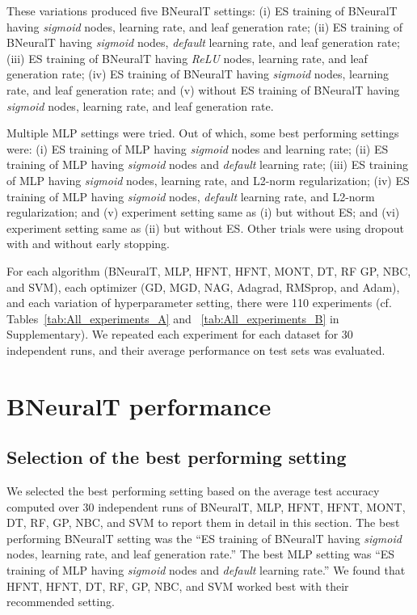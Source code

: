\documentclass[11pt,a4paper]{article}
\begin{document}
    These variations produced five BNeuralT settings: (i) ES training of BNeuralT having \textit{sigmoid} nodes,  learning rate, and  leaf generation rate; (ii) ES training of BNeuralT having \textit{sigmoid} nodes, \textit{default} learning rate, and  leaf generation rate; (iii) ES training of BNeuralT having \textit{ReLU} nodes,  learning rate, and  leaf generation rate; (iv) ES training of BNeuralT having \textit{sigmoid} nodes,  learning rate, and  leaf generation rate; and (v) without ES training of BNeuralT having \textit{sigmoid} nodes,  learning rate, and  leaf generation rate. 
    
    Multiple MLP settings were tried. Out of which, some best performing settings were: (i) ES training of MLP having \textit{sigmoid} nodes and  learning rate; (ii) ES training of MLP having \textit{sigmoid} nodes and \textit{default} learning rate; (iii) ES training of MLP having \textit{sigmoid} nodes,  learning rate, and L2-norm regularization; (iv) ES training of MLP having \textit{sigmoid} nodes, \textit{default} learning rate, and L2-norm regularization; and (v) experiment setting same as (i) but without ES; and (vi) experiment setting same as (ii) but without ES. Other trials were using dropout with and without early stopping. 
    
    For each algorithm (BNeuralT, MLP, HFNT, HFNT, MONT, DT, RF GP, NBC, and SVM), each optimizer (GD, MGD, NAG, Adagrad, RMSprop, and Adam), and each variation of hyperparameter setting, there were 110 experiments (cf. Tables~\ref{tab:All_experiments_A} and ~\ref{tab:All_experiments_B} in Supplementary). We repeated each experiment for each dataset for 30 independent runs, and their average performance on test sets was evaluated.
    
    \section{BNeuralT performance}
    \label{sec:res_dis}
\subsection{Selection of the best performing setting} 
We selected the best performing setting based on the average test accuracy computed over 30 independent runs of BNeuralT, MLP, HFNT, HFNT, MONT, DT, RF, GP, NBC, and SVM  to report them in detail in this section. The best performing BNeuralT setting was the ``ES training of BNeuralT having \textit{sigmoid} nodes,  learning rate, and  leaf generation rate.'' The best MLP setting was ``ES training of MLP having \textit{sigmoid} nodes and \textit{default} learning rate.'' We found that HFNT, HFNT, DT, RF, GP, NBC, and SVM worked best with their recommended setting.
    
\end{document}
